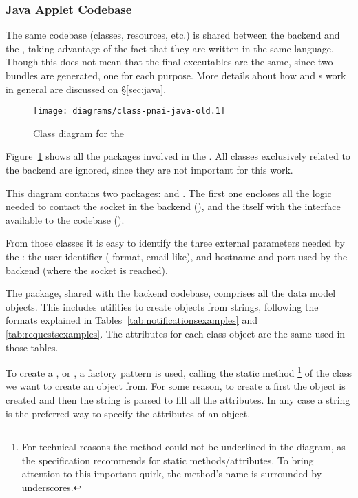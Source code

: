 \subsubsection{Java Applet Codebase} %
\label{ssub:appletcodeold}

The same codebase (classes, resources, etc.) is shared between the  backend and the , taking advantage of the fact that they are written in the same language.
Though this does not mean that the final executables are the same, since two bundles are generated, one for each purpose.
More details about how  and s work in general are discussed on \S\ref{sec:java}.

\begin{figure}[htbp]
  \centering
    \texttt{[image: diagrams/class-pnai-java-old.1]}
  \caption{Class diagram for the }
  \label{fig:class-pnai-java-old}
\end{figure}

Figure~\ref{fig:class-pnai-java-old} shows all the packages involved in the .
All classes exclusively related to the  backend are ignored, since they are not important for this work.

This diagram contains two packages:  and .
The first one encloses all the logic needed to contact the socket in the backend (), and the  itself with the interface available to the  codebase ().

From those classes it is easy to identify the three external parameters needed by the : the user identifier ( format, email-like), and hostname and port used by the backend (where the socket is reached).

The  package, shared with the backend codebase, comprises all the data model objects.
This includes utilities to create objects from strings, following the formats explained in Tables~\ref{tab:notificationsexamples} and \ref{tab:requestsexamples}.
The attributes for each class object are the same used in those tables.

To create a ,  or , a factory pattern is used, calling the static method \footnote{For technical reasons the method  could not be underlined in the diagram, as the  specification recommends for static methods/attributes.
To bring attention to this important quirk, the method's name is surrounded by underscores.} of the class we want to create an object from.
For some reason, to create a  first the object is created and then the string is parsed to fill all the attributes.
In any case a string is the preferred way to specify the attributes of an object.

